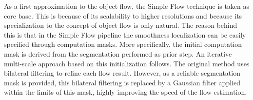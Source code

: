 As a first approximation to the object flow, the Simple Flow technique \cite{c21} is taken as core base. This is because of its scalability 
to higher resolutions and because its specialization to the concept of object flow is only natural. The reason behind this is that in the Simple Flow pipeline 
the smoothness localization can be easily specified through computation masks. More specifically, the initial computation mask is derived from 
the segmentation performed as prior step. An iterative multi-scale approach based on this initialization follows. The original method uses bilateral filtering to refine each flow result. 
However, as a reliable segmentation mask is provided, this bilateral filtering is replaced by a Gaussian filter applied within the limits of this mask, highly improving the speed of the 
flow estimation. 


